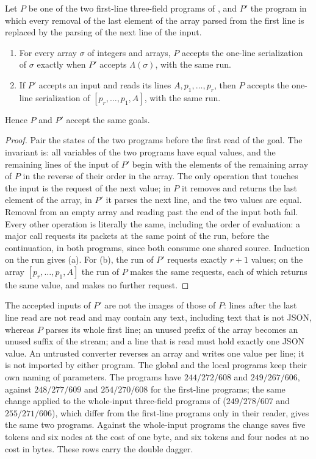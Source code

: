 \begin{proposition}\label{cert:prop:stream}
Let $P$ be one of the two first-line three-field programs of
, and $P'$ the program in which every removal of the last
element of the array parsed from the first line is replaced by the parsing of
the next line of the input.
\begin{enumerate}[label=(\alph*)]
\item For every array $\sigma$ of integers and arrays, $P$ accepts the one-line
serialization of $\sigma$ exactly when $P'$ accepts $\Lambda(\sigma)$, with
the same run.
\item If $P'$ accepts an input and reads its lines $A,p_1,\dots,p_r$, then $P$
accepts the one-line serialization of $[p_r,\dots,p_1,A]$, with the same run.
\end{enumerate}
Hence $P$ and $P'$ accept the same goals.
\end{proposition}
\begin{proof}
Pair the states of the two programs before the first read of the goal. The
invariant is: all variables of the two programs have equal values, and the
remaining lines of the input of $P'$ begin with the elements of the remaining
array of $P$ in the reverse of their order in the array. The only operation
that touches the input is the request of the next value; in $P$ it removes and
returns the last element of the array, in $P'$ it parses the next line, and
the two values are equal. Removal from an empty array and reading past the
end of the input both fail. Every other operation is literally the same,
including the order of evaluation: a major call requests its packets at the
same point of the run, before the continuation, in both programs, since both
consume one shared source. Induction on the run gives (a). For (b), the run of
$P'$ requests exactly $r+1$ values; on the array $[p_r,\dots,p_1,A]$ the run of
$P$ makes the same requests, each of which returns the same value, and makes no
further request.
\end{proof}

The accepted inputs of $P'$ are not the images of those of $P$: lines after the
last line read are not read and may contain any text, including text that is
not JSON, whereas $P$ parses its whole first line; an unused prefix of the
array becomes an unused suffix of the stream; and a line that is read must hold
exactly one JSON value. An untrusted converter reverses an array and writes one
value per line; it is not imported by either program. The global and the local
programs keep their own naming of parameters. The programs have $244/272/608$
and $249/267/606$, against $248/277/609$ and $254/270/608$ for the first-line
programs; the same change applied to the whole-input three-field programs of
 ($249/278/607$ and $255/271/606$), which differ from the
first-line programs only in their reader, gives the same two programs. Against
the whole-input programs the change saves five tokens and six nodes at the cost
of one byte, and six tokens and four nodes at no cost in bytes. These rows
carry the double dagger.

